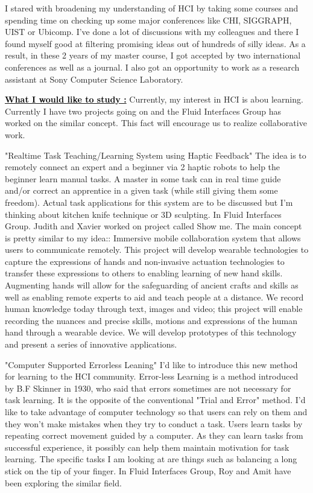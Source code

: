 \documentclass{article}
\newcommand{\statement}[1]{\par\medskip
  \underline{\textcolor{black}{\textbf{#1:}}}\space
}
\begin{document}
 I stared with broadening my understanding of HCI by taking some courses and spending time on checking up some major conferences like CHI, SIGGRAPH, UIST or Ubicomp. I've done a lot of discussions with my colleagues and there I found myself good at filtering promising ideas out of hundreds of silly ideas. As a result, in these 2 years of my master course, I got accepted by two international conferences as well as a journal. I also got an opportunity to work as a research assistant at Sony Computer Science Laboratory. 


\statement{What I would like to study } Currently, my interest in HCI is abou learning. Currently I have two projects going on and the Fluid Interfaces Group has worked on the similar concept. This fact will encourage us to realize collaborative work.

"Realtime Task Teaching/Learning System using Haptic Feedback"
The idea is to remotely connect an expert and a beginner via 2 haptic robots to help the beginner learn manual tasks. A master in some task can in real time guide and/or correct an apprentice in a given task (while still giving them some freedom). Actual task applications for this system are to be discussed but I'm thinking about kitchen knife technique or 3D sculpting. In Fluid Interfaces Group. Judith and Xavier worked on project called Show me. The main concept is pretty similar to my idea:: Immersive mobile collaboration system that allows users to communicate remotely. This project will develop wearable technologies to capture the expressions of hands and non-invasive actuation technologies to transfer these expressions to others to enabling learning of new hand skills. Augmenting hands will allow for the safeguarding of ancient crafts and skills as well as enabling remote experts to aid and teach people at a distance. We record human knowledge today through text, images and video; this project will enable recording the nuances and precise skills, motions and expressions of the human hand through a wearable device. We will develop prototypes of this technology and present a series of innovative applications.


"Computer Supported Errorless Leaning" 
I'd like to introduce this new method for learning to the HCI community. Error-less Learning is a method introduced by B.F Skinner in 1930, who said that errors sometimes are not necessary for task learning. It is the opposite of the conventional "Trial and Error" method. I'd like to take advantage of computer technology so that users can rely on them and they won't make mistakes when they try to conduct a task. Users learn tasks by repeating correct movement guided by a computer. As they can learn tasks from successful experience, it possibly can help them  maintain motivation for task learning. The specific tasks I am looking at are things such as balancing a long stick on the tip of your finger. In Fluid Interfaces Group, Roy and Amit have been exploring the similar field. 
\end{document}
